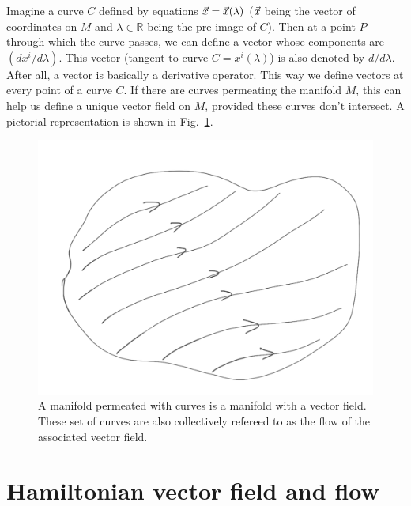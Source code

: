 Imagine a curve $C$ defined by equations 
$\vec{x} = \vec{x}(\lambda)$ ($\vec{x}$ being the vector
of coordinates on $M$ and $\lambda  \in  \mathbb{R} $
 being the pre-image of $C$). Then at a point $P$ through which 
 the curve passes, we can 
define a vector whose components are $(dx^i/d \lambda)$. 
This vector (tangent to curve $C = x^i(\lambda)$)
is also denoted by $d/d \lambda$. After all,
 a vector is basically  a derivative operator.
This way we define vectors at every point of a curve $C$. If there are curves permeating
the manifold $M$, this can help us define a unique vector field on $M$, provided 
these curves don't intersect. A pictorial representation is shown in 
Fig.~\ref{vector_field}.




\begin{figure}
   \centering
  \includegraphics[width=0.4\linewidth]{vector_field}
  \caption{A manifold permeated with curves is a manifold with a vector field.
  These set of curves are also collectively refereed to as the flow of the
  associated vector field.
    \vspace{-1.em}
  }
  \label{vector_field}
\end{figure}


\section{Hamiltonian vector field and flow}

